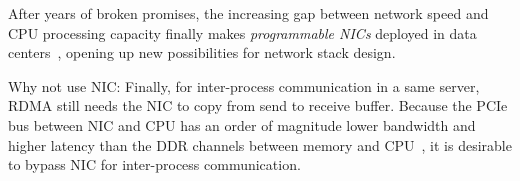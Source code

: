 After years of broken promises, the increasing gap between network speed and CPU processing capacity finally makes \textit{programmable NICs} deployed in data centers~\cite{smartnic}, opening up new possibilities for network stack design.

Why not use NIC:
Finally, for inter-process communication in a same server, RDMA still needs the NIC to copy from send to receive buffer. Because the PCIe bus between NIC and CPU has an order of magnitude lower bandwidth and higher latency than the DDR channels between memory and CPU~\cite{li2017kv}, it is desirable to bypass NIC for inter-process communication.
